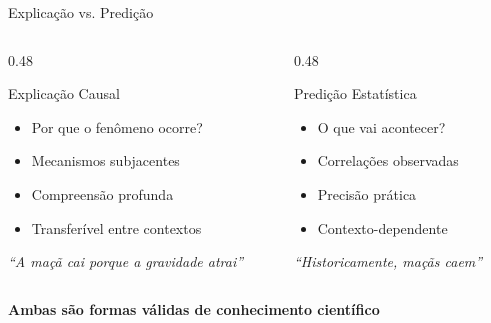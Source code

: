 \documentclass[aspectratio=169,12pt]{beamer}
\begin{document}
\begin{frame}{Explicação vs. Predição}
    \begin{columns}[T]
        \begin{column}{0.48\textwidth}
            \begin{block}{Explicação Causal}
                \begin{itemize}
                    \item Por que o fenômeno ocorre?
                    \item Mecanismos subjacentes
                    \item Compreensão profunda
                    \item Transferível entre contextos
                \end{itemize}

                \vspace{0.3cm}
                \centering
                \textit{``A maçã cai porque a gravidade atrai''}
            \end{block}
        \end{column}
        \begin{column}{0.48\textwidth}
            \begin{block}{Predição Estatística}
                \begin{itemize}
                    \item O que vai acontecer?
                    \item Correlações observadas
                    \item Precisão prática
                    \item Contexto-dependente
                \end{itemize}

                \vspace{0.3cm}
                \centering
                \textit{``Historicamente, maçãs caem''}
            \end{block}
        \end{column}
    \end{columns}

    \vspace{0.5cm}

    \begin{center}
        \textbf{Ambas são formas válidas de conhecimento científico}
    \end{center}
\end{frame}
\end{document}
